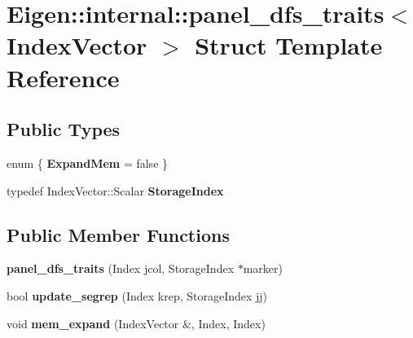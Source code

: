 \hypertarget{struct_eigen_1_1internal_1_1panel__dfs__traits}{}\section{Eigen\+::internal\+::panel\+\_\+dfs\+\_\+traits$<$ Index\+Vector $>$ Struct Template Reference}
\label{struct_eigen_1_1internal_1_1panel__dfs__traits}
\subsection*{Public Types}
\begin{DoxyCompactItemize}
\item 
\mbox{\label{struct_eigen_1_1internal_1_1panel__dfs__traits_af71003ea173d6f6c5ccaf4c79f8c3076}} 
enum \{ {\bfseries Expand\+Mem} = false
 \}
\item 
\mbox{\label{struct_eigen_1_1internal_1_1panel__dfs__traits_ac2c2ba4aabe69f4f9ed0fa2d4e5a243f}} 
typedef Index\+Vector\+::\+Scalar {\bfseries Storage\+Index}
\end{DoxyCompactItemize}
\subsection*{Public Member Functions}
\begin{DoxyCompactItemize}
\item 
\mbox{\label{struct_eigen_1_1internal_1_1panel__dfs__traits_a3efb9fc2c299aace73e1b18a53bd0b26}} 
{\bfseries panel\+\_\+dfs\+\_\+traits} (Index jcol, Storage\+Index $\ast$marker)
\item 
\mbox{\label{struct_eigen_1_1internal_1_1panel__dfs__traits_a0e870a6937edbfa331104aff1122459b}} 
bool {\bfseries update\+\_\+segrep} (Index krep, Storage\+Index jj)
\item 
\mbox{\label{struct_eigen_1_1internal_1_1panel__dfs__traits_a51632d430c16b88f79f911ee7168de1f}} 
void {\bfseries mem\+\_\+expand} (Index\+Vector \&, Index, Index)
\end{DoxyCompactItemize}
